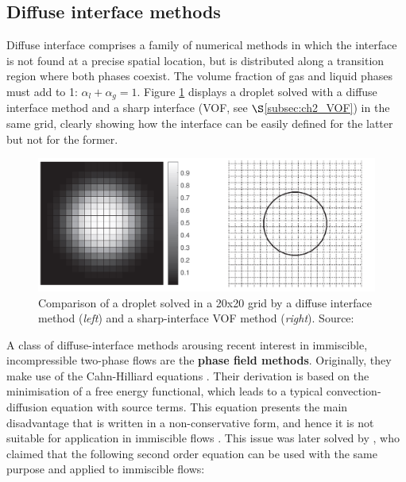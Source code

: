 \subsection{Diffuse interface methods}
\label{subsec:ch2_DI_methods}

Diffuse interface comprises a family of numerical methods in which the interface is not found at a precise spatial location, but is distributed along a transition region where both phases coexist. The volume fraction of gas and liquid phases must add to 1: $\alpha_l + \alpha_g = 1$. Figure \ref{fig:DI_vs_VOF} displays a droplet solved with a diffuse interface method and a sharp interface (VOF, see $\S$\ref{subsec:ch2_VOF}) in the same grid, clearly showing how the interface can be easily defined for the latter but not for the former. %

\begin{figure}[h!]
	\centering
	\includegraphics[scale=0.45]{./part1_numerical_approaches/figures_ch2/DI_vs_VOF_Mirjalili}
	\caption[Comparison of a droplet solved in a 20x20 grid by a diffuse interface method  and a sharp-interface VOF method]{Comparison of a droplet solved in a 20x20 grid by a diffuse interface method (\textit{left}) and a sharp-interface VOF method (\textit{right}). Source: }
	\label{fig:DI_vs_VOF}
\end{figure}


A class of diffuse-interface methods arousing recent interest in immiscible, incompressible two-phase flows are the \textbf{phase field methods}. Originally, they make use of the Cahn-Hilliard equations . Their derivation is based on the minimisation of a free energy functional, which leads to a typical convection-diffusion equation with source terms. This equation presents the main disadvantage that is written in a non-conservative form, and hence it is not suitable for application in immiscible flows . This issue was later solved by , who claimed that the following second order equation can be used with the same purpose and applied to immiscible flows:

